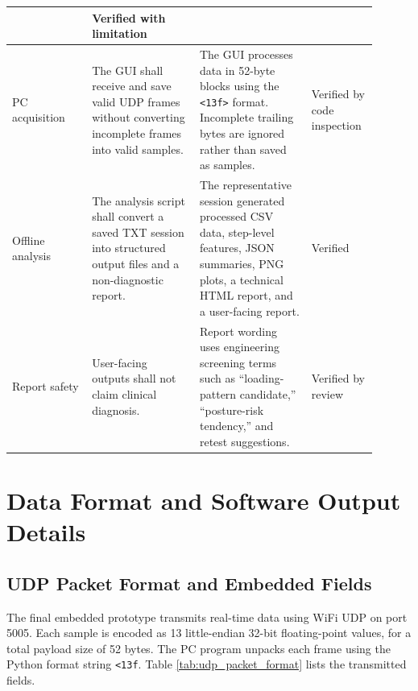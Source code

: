 \begin{table}[p]
\begin{tabular}{|p{0.20\linewidth}|p{0.27\linewidth}|p{0.29\linewidth}|p{0.14\linewidth}|}
& Verified with limitation \\
\hline
PC acquisition
& The GUI shall receive and save valid UDP frames without converting incomplete frames into valid samples.
& The GUI processes data in 52-byte blocks using the \texttt{<13f>} format. Incomplete trailing bytes are ignored rather than saved as samples.
& Verified by code inspection \\
\hline
Offline analysis
& The analysis script shall convert a saved TXT session into structured output files and a non-diagnostic report.
& The representative session generated processed CSV data, step-level features, JSON summaries, PNG plots, a technical HTML report, and a user-facing report.
& Verified \\
\hline
Report safety
& User-facing outputs shall not claim clinical diagnosis.
& Report wording uses engineering screening terms such as ``loading-pattern candidate,'' ``posture-risk tendency,'' and retest suggestions.
& Verified by review \\
\hline
\end{tabular}
\end{table}


\section{Data Format and Software Output Details}
\label{app:data_format}

\subsection{UDP Packet Format and Embedded Fields}
\label{app:udp_packet_format}

The final embedded prototype transmits real-time data using WiFi UDP on port 5005. Each sample is encoded as 13 little-endian 32-bit floating-point values, for a total payload size of 52 bytes. The PC program unpacks each frame using the Python format string \texttt{<13f}. Table \ref{tab:udp_packet_format} lists the transmitted fields.

